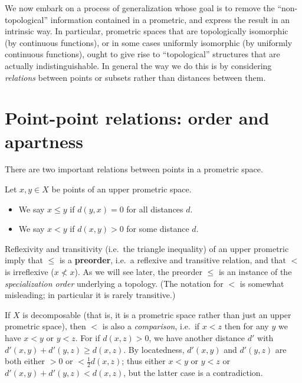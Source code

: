 \documentclass{article}
\begin{document}

We now embark on a process of generalization whose goal is to remove the ``non-topological'' information contained in a prometric, and express the result in an intrinsic way.
In particular, prometric spaces that are topologically isomorphic (by continuous functions), or in some cases uniformly isomorphic (by uniformly continuous functions), ought to give rise to ``topological'' structures that are actually indistinguishable.
In general the way we do this is by considering \emph{relations} between points or subsets rather than distances between them.


\section{Point-point relations: order and apartness}
\label{sec:point-point}
\label{sec:order}

There are two important relations between points in a prometric space.

\begin{defn}
  Let $x,y\in X$ be points of an upper prometric space.
  \begin{itemize}
  \item We say $x\le y$ if $d(y,x)=0$ for all distances $d$.
  \item We say $x<y$ if $d(x,y)>0$ for some distance $d$.
  \end{itemize}
\end{defn}

Reflexivity and transitivity (i.e.\ the triangle inequality) of an upper prometric imply that $\le$ is a \textbf{preorder}, i.e.\ a reflexive and transitive relation, and that $<$ is irreflexive ($x\not<x$).
As we will see later, the preorder $\le$ is an instance of the \emph{specialization order} underlying a topology.
(The notation for $<$ is somewhat misleading; in particular it is rarely transitive.)

If $X$ is decomposable (that is, it is a prometric space rather than just an upper prometric space), then $<$ is also a \emph{comparison}, i.e.\ if $x<z$ then for any $y$ we have $x<y$ or $y<z$.
For if $d(x,z)>0$, we have another distance $d'$ with $d'(x,y)+d'(y,z)\ge d(x,z)$.
By locatedness, $d'(x,y)$ and $d'(y,z)$ are both either $>0$ or $<\frac12 d(x,z)$; thus either $x<y$ or $y<z$ or $d'(x,y)+d'(y,z) < d(x,z)$, but the latter case is a contradiction.
\end{document}
